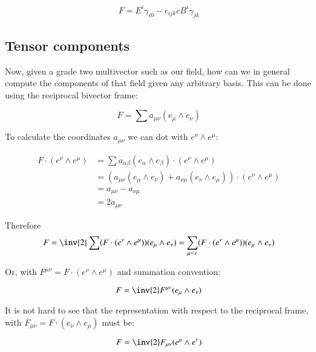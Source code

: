 \begin{equation}\label{eqn:maxToTensor:Fcomp}
F = E^i \gamma_{i 0} - \epsilon_{i j k} c B^i \gamma_{j k}
\end{equation}

\subsection{Tensor components }

Now, given a grade two multivector such as our field, how can we in general compute the components of that field given any arbitrary basis.  This can be done using the reciprocal bivector frame:

\begin{equation*}
F = \sum a_{{\mu} {\nu}} (e_{\mu} \wedge e_{\nu})
\end{equation*}

To calculate the coordinates $a_{{\mu} {\nu}}$ we can dot with
$e^{\nu} \wedge e^{\mu}$:

\begin{align*}
F \cdot (e^{\nu} \wedge e^{\mu})
&= \sum a_{{\alpha} {\beta}} (e_{\alpha} \wedge e_{\beta}) \cdot (e^{\nu} \wedge e^{\mu}) \\
&= ( a_{{\mu} {\nu}} (e_{\mu} \wedge e_{\nu}) + a_{{\nu} {\mu}} (e_{\nu} \wedge e_{\mu}) ) \cdot (e^{\nu} \wedge e^{\mu}) \\
&= a_{{\mu} {\nu}} - a_{{\nu} {\mu}} \\
&= 2 a_{{\mu} {\nu}}
\end{align*}

Therefore
\begin{equation*}
F = \inv{2} \sum (F \cdot (e^{\nu} \wedge e^{\mu})) (e_{\mu} \wedge e_{\nu}) = \sum_{{\mu}<{\nu}} (F \cdot (e^{\nu} \wedge e^{\mu})) (e_{\mu} \wedge e_{\nu})
\end{equation*}

Or, with $F^{{\mu} {\nu}} = F \cdot (e^{\nu} \wedge e^{\mu})$ and summation convention:

\begin{equation}
F = \inv{2} F^{{\mu} {\nu}} (e_{\mu} \wedge e_{\nu})
\end{equation}

It is not hard to see that the representation with respect to the reciprocal frame, with
$F_{{\mu} {\nu}} = F \cdot (e_{\nu} \wedge e_{\mu})$ must be:

\begin{equation}
F = \inv{2} F_{{\mu} {\nu}} (e^{\mu} \wedge e^{\nu})
\end{equation}

